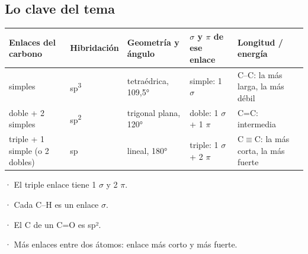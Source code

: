 \subsection{Lo clave del tema}
\begin{center}\small
\begin{tabularx}{\linewidth}{@{}>{\raggedright\arraybackslash\hsize=1.30\hsize}X>{\raggedright\arraybackslash\hsize=0.57\hsize}X>{\raggedright\arraybackslash\hsize=0.81\hsize}X>{\raggedright\arraybackslash\hsize=1.02\hsize}X>{\raggedright\arraybackslash\hsize=1.30\hsize}X@{}}
\toprule
\textbf{Enlaces del carbono} & \textbf{Hibridación} & \textbf{Geometría y ángulo} & \textbf{$\sigma$ y $\pi$ de ese enlace} & \textbf{Longitud / energía} \\
\midrule
4 simples & sp\textsuperscript{3} & tetraédrica, 109,5° & simple: 1 $\sigma$ & C--C: la más larga, la más débil \\
1 doble + 2 simples & sp\textsuperscript{2} & trigonal plana, 120° & doble: 1 $\sigma$ + 1 $\pi$ & C=C: intermedia \\
1 triple + 1 simple (o 2 dobles) & sp & lineal, 180° & triple: 1 $\sigma$ + 2 $\pi$ & C\ensuremath{\equiv}C: la más corta, la más fuerte \\
\bottomrule
\end{tabularx}
\end{center}
  
\begin{clave}[{Recuerda}] · El triple enlace tiene 1 $\sigma$ y 2 $\pi$.\par · Cada C--H es un enlace $\sigma$.\par · El C de un C=O es sp².\par · Más enlaces entre dos átomos: enlace más corto y más fuerte.\end{clave}
  
